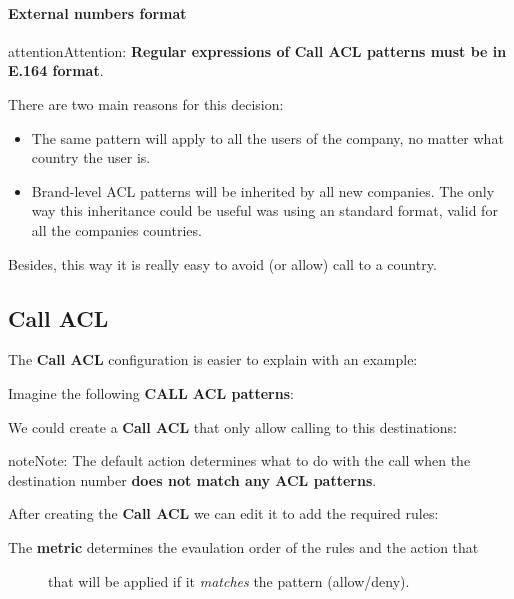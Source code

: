 \documentclass[letterpaper,10pt,english]{sphinxmanual}
\begin{document}
\paragraph{External numbers format}

\begin{notice}{attention}{Attention:}
\textbf{Regular expressions of Call ACL patterns must be in E.164 format}.
\end{notice}

There are two main reasons for this decision:
\begin{itemize}
\item {} 
The same pattern will apply to all the users of the company,  no matter
what country the user is.

\item {} 
Brand-level ACL patterns will be inherited by all new companies. The only way
this inheritance could be useful was using an standard format, valid for all the
companies countries.

\end{itemize}

Besides, this way it is really easy to avoid (or allow) call to a country.


\subsection{Call ACL}
\label{pbx_features/call_permissions:call-acl}
The \textbf{Call ACL} configuration is easier to explain with an example:

Imagine the following \textbf{CALL ACL patterns}:

\noindent{}

We could create a \textbf{Call ACL} that only allow calling to this destinations:

\noindent{}

\begin{notice}{note}{Note:}
The default action determines what to do with the call when the
destination number \textbf{does not match any ACL patterns}.
\end{notice}

After creating the \textbf{Call ACL} we can edit it to add the required rules:

\noindent{}
\begin{description}
\item[{The \textbf{metric} determines the evaulation order of the rules and the action that}] \leavevmode
that will be applied if it \emph{matches} the pattern (allow/deny).

\end{description}
\end{document}
